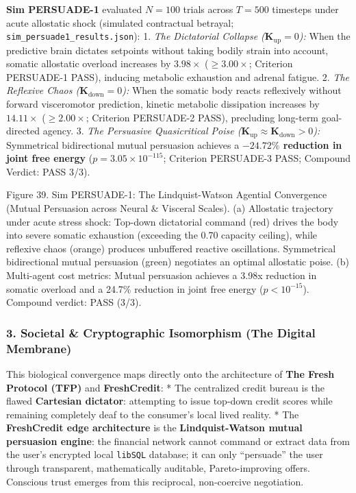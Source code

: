 \documentclass[
]{article}
\begin{document}
\textbf{Sim PERSUADE-1} evaluated \(N = 100\) trials across \(T = 500\)
timesteps under acute allostatic shock (simulated contractual betrayal;
\texttt{sim\_persuade1\_results.json}): 1. \emph{The Dictatorial
Collapse (\(\mathbf{K}_{\mathrm{up}} = 0\)):} When the predictive brain
dictates setpoints without taking bodily strain into account, somatic
allostatic overload increases by \textbf{\(3.98\times\)}
(\(\ge 3.00\times\); Criterion PERSUADE-1 PASS), inducing metabolic
exhaustion and adrenal fatigue. 2. \emph{The Reflexive Chaos
(\(\mathbf{K}_{\mathrm{down}} = 0\)):} When the somatic body reacts
reflexively without forward visceromotor prediction, kinetic metabolic
dissipation increases by \textbf{\(14.11\times\)} (\(\ge 2.00\times\);
Criterion PERSUADE-2 PASS), precluding long-term goal-directed agency.
3. \emph{The Persuasive Quasicritical Poise
(\(\mathbf{K}_{\mathrm{up}} \approx \mathbf{K}_{\mathrm{down}} > 0\)):}
Symmetrical bidirectional mutual persuasion achieves a
\textbf{\(-24.72\%\) reduction in joint free energy}
(\(p = 3.05 \times 10^{-115}\); Criterion PERSUADE-3 PASS; Compound
Verdict: PASS 3/3).

Figure 39. Sim PERSUADE-1: The Lindquist-Watson Agential Convergence
(Mutual Persuasion across Neural \& Visceral Scales). (a) Allostatic
trajectory under acute stress shock: Top-down dictatorial command (red)
drives the body into severe somatic exhaustion (exceeding the 0.70
capacity ceiling), while reflexive chaos (orange) produces unbuffered
reactive oscillations. Symmetrical bidirectional mutual persuasion
(green) negotiates an optimal allostatic poise. (b) Multi-agent cost
metrics: Mutual persuasion achieves a 3.98x reduction in somatic
overload and a 24.7\% reduction in joint free energy (\(p < 10^{-15}\)).
Compound verdict: PASS (3/3).

\subsubsection{3. Societal \& Cryptographic Isomorphism (The Digital
Membrane)}\label{societal-cryptographic-isomorphism-the-digital-membrane}

This biological convergence maps directly onto the architecture of
\textbf{The Fresh Protocol (TFP)} and \textbf{FreshCredit}: * The
centralized credit bureau is the flawed \textbf{Cartesian dictator}:
attempting to issue top-down credit scores while remaining completely
deaf to the consumer's local lived reality. * The \textbf{FreshCredit
edge architecture} is the \textbf{Lindquist-Watson mutual persuasion
engine}: the financial network cannot command or extract data from the
user's encrypted local \texttt{libSQL} database; it can only
``persuade'' the user through transparent, mathematically auditable,
Pareto-improving offers. Conscious trust emerges from this reciprocal,
non-coercive negotiation.
\end{document}
